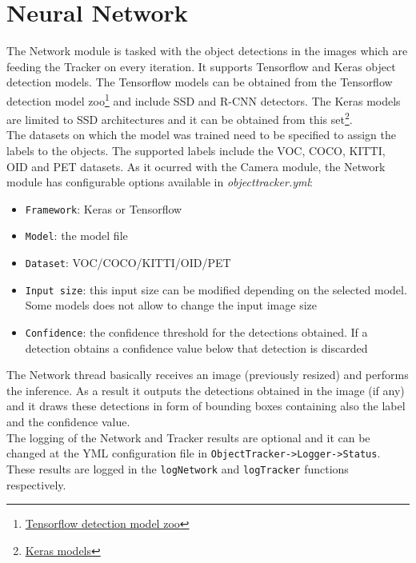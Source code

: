 \section{Neural Network}\label{neural_networks}
The Network module is tasked with the object detections in the images which are feeding the Tracker on every iteration. It supports Tensorflow and Keras object detection models. The Tensorflow models can be obtained from the Tensorflow detection model zoo\footnote{\href {https://github.com/tensorflow/models/blob/master/research/object_detection/g3doc/detection_model_zoo.md}{Tensorflow detection model zoo}} and include SSD and R-CNN detectors. The Keras models are limited to SSD architectures and it can be obtained from this set\footnote{\href {https://github.com/pierluigiferrari/ssd_keras#download-the-original-trained-model-weights}{Keras models}}.\\
The datasets on which the model was trained need to be specified to assign the labels to the objects. The supported labels include the VOC, COCO, KITTI, OID and PET datasets. As it ocurred with the Camera module, the Network module has configurable options available in \textit{objecttracker.yml}:
\begin{itemize}
    \item \texttt{Framework}: Keras or Tensorflow
    \item \texttt{Model}: the model file
    \item \texttt{Dataset}: VOC/COCO/KITTI/OID/PET
    \item \texttt{Input size}: this input size can be modified depending on the selected model. Some models does not allow to change the input image size
    \item \texttt{Confidence}: the confidence threshold for the detections obtained. If a detection obtains a confidence value below that detection is discarded
\end{itemize}
The Network thread basically receives an image (previously resized) and performs the inference. As a result it outputs the detections obtained in the image (if any) and it draws these detections in form of bounding boxes containing also the label and the confidence value.\\
The logging of the Network and Tracker results are optional and it can be changed at the YML configuration file in \texttt{ObjectTracker->Logger->Status}. These results are logged in the \texttt{logNetwork} and \texttt{logTracker} functions respectively.\\

